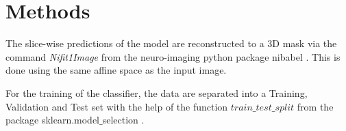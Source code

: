 \section{Methods}
The slice-wise predictions of the model are reconstructed to a 3D mask via the command \textit{Nifit1Image} from the neuro-imaging python package nibabel \cite{noauthor_neuroimaging_nodate}.
This is done using the same affine space as the input image.

For the training of the classifier, the data are separated into a Training, Validation and Test set with the help of the function $train\_test\_split$ from the package sklearn.model$\_$selection \cite{noauthor_scikit-learn/scikit-learn_2020}. 